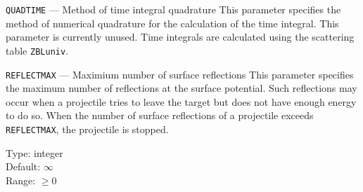 \begin{keydescription}{\texttt{QUADTIME} --- Method of time integral quadrature}
%
  This parameter specifies the method of numerical quadrature for the
  calculation of the time integral. This parameter is currently unused.
  Time integrals are calculated using the scattering table \texttt{ZBLuniv}. 

\end{keydescription}

\begin{keydescription}{\texttt{REFLECTMAX} --- Maximium number of surface 
reflections}
%
  This parameter specifies the maximum number of reflections at the surface
  potential. Such reflections may occur when a projectile tries to leave the 
  target but does not have enough energy to do so. When the number of surface 
  reflections of a projectile exceeds \texttt{REFLECTMAX}, the projectile is 
  stopped. 
  \begin{keytab}
    Type:    \> integer \\ 
    Default: \> $\infty$ \\
    Range:   \> $\ge 0$
  \end{keytab}
\end{keydescription}

